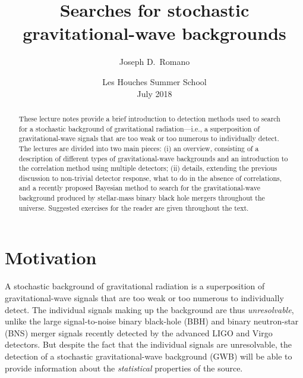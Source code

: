 \documentclass[11pt]{article}
\numberwithin{equation}{section}
\begin{document}
\title{Searches for stochastic gravitational-wave backgrounds}
\author{Joseph D.\ Romano}
\date{Les Houches Summer School\\
July 2018}

\maketitle

\begin{abstract}
These lecture notes provide a brief introduction 
to detection methods used to search for a stochastic 
background of gravitational radiation---i.e., a 
superposition of gravitational-wave signals that are 
too weak or too numerous to individually detect.
The lectures are divided into two main pieces:
(i) an overview, consisting of a description of different 
types of gravitational-wave backgrounds and an introduction 
to the correlation method using multiple detectors;
(ii) details, extending the previous discussion to 
non-trivial detector response, what to do in the absence
of correlations, and a recently proposed Bayesian method 
to search for the gravitational-wave background produced 
by stellar-mass binary black hole mergers throughout the 
universe.
Suggested exercises for the reader are given throughout 
the text.
\end{abstract}

\pagebreak
\tableofcontents
\pagebreak


\section{Motivation}

A stochastic background of gravitational radiation 
is a superposition of gravitational-wave signals that
are too weak or too numerous to individually detect.
The individual signals making up the background are thus
{\em unresolvable}, unlike the large signal-to-noise 
binary black-hole (BBH) and binary neutron-star (BNS)
merger signals recently detected by the advanced LIGO 
and Virgo detectors.
But despite the fact that the individual signals are 
unresolvable, the detection of a stochastic 
gravitational-wave background (GWB) will 
be able to provide information about the 
{\em statistical} properties of the source.
\end{document}
